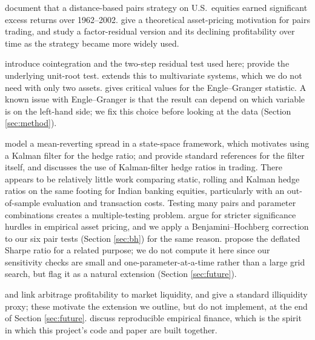 \documentclass[11pt,a4paper]{article}
\begin{document}
\citet{gatev2006pairs} document that a distance-based pairs strategy on U.S.\ equities earned significant excess returns over 1962--2002. \citet{do2006pairs} give a theoretical asset-pricing motivation for pairs trading, and \citet{avellaneda2010statistical} study a factor-residual version and its declining profitability over time as the strategy became more widely used.

\citet{engle1987co} introduce cointegration and the two-step residual test used here; \citet{dickey1979distribution} provide the underlying unit-root test. \citet{johansen1991estimation} extends this to multivariate systems, which we do not need with only two assets. \citet{mackinnon1996numerical} gives critical values for the Engle--Granger statistic. A known issue with Engle--Granger is that the result can depend on which variable is on the left-hand side; we fix this choice before looking at the data (Section \ref{sec:method}).

\citet{elliott2005pairs} model a mean-reverting spread in a state-space framework, which motivates using a Kalman filter for the hedge ratio; \citet{hamilton1994time} and \citet{durbin2012time} provide standard references for the filter itself, and \citet{chan2013algorithmic} discusses the use of Kalman-filter hedge ratios in trading. There appears to be relatively little work comparing static, rolling and Kalman hedge ratios on the same footing for Indian banking equities, particularly with an out-of-sample evaluation and transaction costs.
Testing many pairs and parameter combinations creates a multiple-testing problem. \citet{harvey2016and} argue for stricter significance hurdles in empirical asset pricing, and we apply a Benjamini--Hochberg correction to our six pair tests (Section \ref{sec:bh}) for the same reason. \citet{bailey2014deflated} propose the deflated Sharpe ratio for a related purpose; we do not compute it here since our sensitivity checks are small and one-parameter-at-a-time rather than a large grid search, but flag it as a natural extension (Section \ref{sec:future}).

\citet{brunnermeier2009market} and \citet{nagel2012evaporating} link arbitrage profitability to market liquidity, and \citet{amihud2002illiquidity} give a standard illiquidity proxy; these motivate the extension we outline, but do not implement, at the end of Section \ref{sec:future}. \citet{aghbabali2025dynamic} discuss reproducible empirical finance, which is the spirit in which this project's code and paper are built together.
\end{document}
